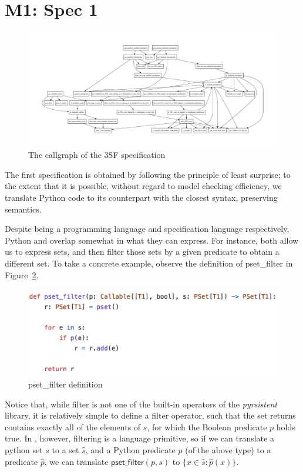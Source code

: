
\section{M1: Spec 1}

\begin{figure}
    \centering
    \includegraphics[width=\textwidth,angle=-90]{ffg-callgraph.pdf}
    \caption{The callgraph of the 3SF specification}
    \label{fig:your_label}
\end{figure}

The first specification is obtained by following the principle of least surprise; to the extent that it is possible, without regard to model checking efficiency, we translate Python code to its \tlap{} counterpart with the closest syntax, preserving semantics.

Despite being a programming language and specification language respectively, Python and \tlap{} overlap somewhat in what they can express. 
For instance, both allow us to express sets, and then filter those sets by a given predicate to obtain a different set.
To take a concrete example, observe the definition of \textsf{pset\_filter} in Figure~\ref{py_filter}.
\begin{figure}
\includegraphics[width=\textwidth]{images/pset_filter.png}
\caption{\textsf{pset\_filter} definition \label{py_filter}}
\end{figure}
%
Notice that, while filter is not one of the built-in operators of the \emph{pyrsistent} library, it is relatively simple to define a filter operator, such that the set returns contains exactly all of the elements of $s$, for which the Boolean predicate $p$ holds true.
In \tlap{}, however, filtering is a language primitive, so if we can translate a python set $s$ to a \tlap{} set $\hat{s}$, and a Python predicate $p$ (of the above type) to a \tlap{} predicate $\hat{p}$, we can translate $\mathsf{pset\_filter}(p, s)$ to $\{ x \in \hat{s}\colon \hat{p}(x) \}$.


